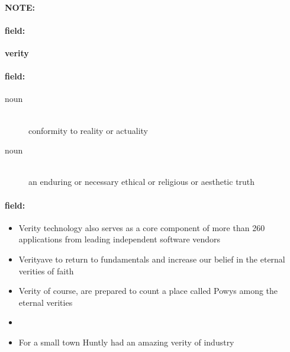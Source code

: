 \documentclass[12pt]{article}
\newenvironment{note}{\paragraph{NOTE:}}{}
\newenvironment{field}{\paragraph{field:}}{}
\begin{document}
\begin{note}
\begin{field}
\textbf{\large verity}
\end{field}


\begin{field}
\begin{description}
\item[noun] \hfill \\ 
conformity to reality or actuality

\item[noun] \hfill \\ 
an enduring or necessary ethical or religious or aesthetic truth

\end{description}
\end{field}

\begin{field}
\begin{itemize}
\item Verity technology also serves as a core component of more than 260 applications from leading independent software vendors
\item Verityave to return to fundamentals and increase our belief in the eternal verities of faith
\item Verity of course, are prepared to count a place called Powys among the eternal verities
\item 
\item For a small town Huntly had an amazing verity of industry
\end{itemize}
\end{field}
\end{note}
\end{document}
